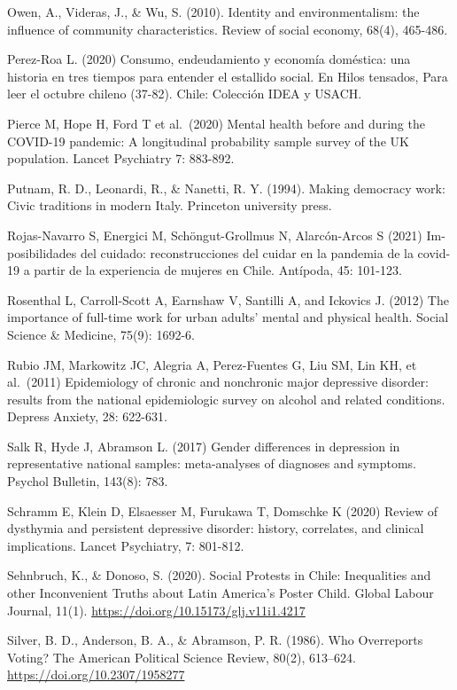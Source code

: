 \documentclass[
  12pt,
]{book}
\begin{document}
Owen, A., Videras, J., \& Wu, S. (2010). Identity and environmentalism: the influence of community characteristics. Review of social economy, 68(4), 465-486.

Perez-Roa L. (2020) Consumo, endeudamiento y economía doméstica: una historia en tres tiempos para entender el estallido social. En Hilos tensados, Para leer el octubre chileno (37-82). Chile: Colección IDEA y USACH.

Pierce M, Hope H, Ford T et al.~(2020) Mental health before and during the COVID-19 pandemic: A longitudinal probability sample survey of the UK population. Lancet Psychiatry 7: 883-892.

Putnam, R. D., Leonardi, R., \& Nanetti, R. Y. (1994). Making democracy work: Civic traditions in modern Italy. Princeton university press.

Rojas-Navarro S, Energici M, Schöngut-Grollmus N, Alarcón-Arcos S (2021) Im-posibilidades del cuidado: reconstrucciones del cuidar en la pandemia de la covid-19 a partir de la experiencia de mujeres en Chile. Antípoda, 45: 101-123.

Rosenthal L, Carroll-Scott A, Earnshaw V, Santilli A, and Ickovics J. (2012) The importance of full-time work for urban adults' mental and physical health. Social Science \& Medicine, 75(9): 1692-6.

Rubio JM, Markowitz JC, Alegria A, Perez-Fuentes G, Liu SM, Lin KH, et al.~(2011) Epidemiology of chronic and nonchronic major depressive disorder: results from the national epidemiologic survey on alcohol and related conditions. Depress Anxiety, 28: 622-631.

Salk R, Hyde J, Abramson L. (2017) Gender differences in depression in representative national samples: meta-analyses of diagnoses and symptoms. Psychol Bulletin, 143(8): 783.

Schramm E, Klein D, Elsaesser M, Furukawa T, Domschke K (2020) Review of dysthymia and persistent depressive disorder: history, correlates, and clinical implications. Lancet Psychiatry, 7: 801-812.

Sehnbruch, K., \& Donoso, S. (2020). Social Protests in Chile: Inequalities and other Inconvenient Truths about Latin America's Poster Child. Global Labour Journal, 11(1). \url{https://doi.org/10.15173/glj.v11i1.4217}

Silver, B. D., Anderson, B. A., \& Abramson, P. R. (1986). Who Overreports Voting? The American Political Science Review, 80(2), 613--624. \url{https://doi.org/10.2307/1958277}
\end{document}

